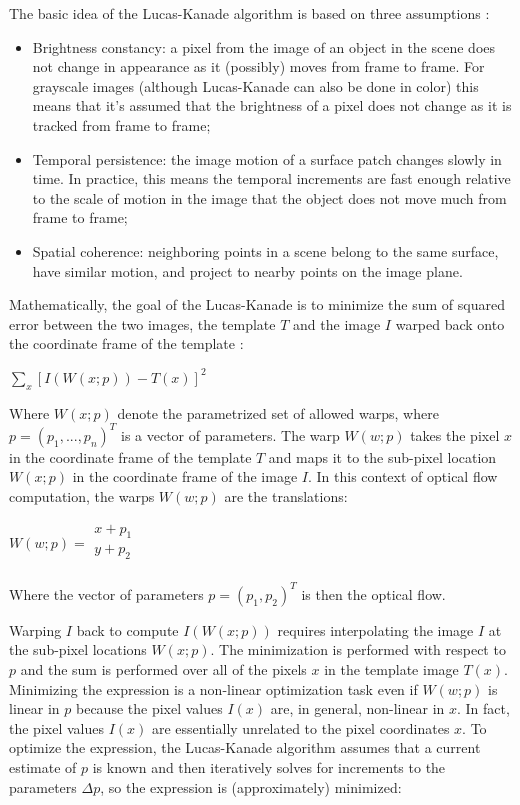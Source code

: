 \documentclass[msc, a4paper, classic, en]{ufbathesis}
\begin{document}
The basic idea of the Lucas-Kanade algorithm is based on three assumptions \cite{bradski2008learning}:

\begin{itemize}
  \item Brightness constancy: a pixel from the image of an object in the scene does not change in appearance as it (possibly) moves from frame to frame. For grayscale images (although Lucas-Kanade can also be done in color) this means that it's assumed that the brightness of a pixel does not change as it is tracked from frame to frame;
  \item Temporal persistence: the image motion of a surface patch changes slowly in time. In practice, this means the temporal increments are fast enough relative to the scale of motion in the image that the object does not move much from frame to frame;
  \item Spatial coherence: neighboring points in a scene belong to the same surface, have similar motion, and project to nearby points on the image plane.
\end{itemize}

Mathematically, the goal of the Lucas-Kanade is to minimize the sum of squared error between the two images, the template $T$ and the image $I$ warped back onto the coordinate frame of the template \cite{lk20}:

\begin{center}
  $\sum_{x}{[I(W(x;p))-T(x)]^2}$
\end{center}

Where $W(x;p)$ denote the parametrized set of allowed warps, where $p = (p_1,...,p_n)^T$ is a vector of parameters. The warp $W(w;p)$ takes the pixel $x$ in the coordinate frame of the template $T$ and maps it to the sub-pixel location $W(x;p)$ in the coordinate frame of the image $I$. In this context of optical flow computation, the warps $W(w;p)$ are the translations:

\begin{center}
$W(w;p) = \begin{matrix}
          x + p_1 \\
          y + p_2 \\
          \end{matrix}$
\end{center}

Where the vector of parameters $p = (p_1, p_2)^T$ is then the optical flow.

Warping $I$ back to compute $I(W(x;p))$ requires interpolating the image $I$ at the sub-pixel locations $W(x;p)$. The minimization is performed with respect to $p$ and the sum is performed over all of the pixels $x$ in the template image $T(x)$. Minimizing the expression is a non-linear optimization task even if $W(w;p)$ is linear in $p$ because the pixel values $I(x)$ are, in general, non-linear in $x$. In fact, the pixel values $I(x)$ are essentially unrelated to the pixel coordinates $x$. To optimize the expression, the Lucas-Kanade algorithm assumes that a current estimate of $p$ is known and then iteratively solves for increments to the parameters $\Delta{p}$, so the expression is (approximately) minimized:
\end{document}
